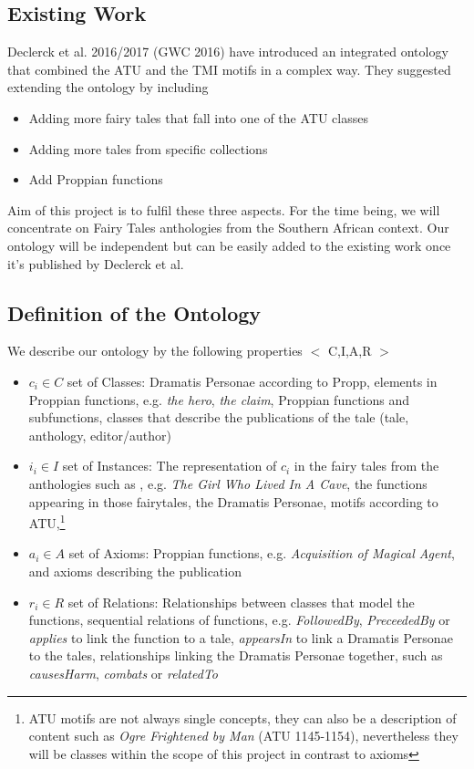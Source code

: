 \documentclass[10pt,a4paper]{article}
\begin{document}
	\subsection{Existing Work} 
	Declerck et al. 2016/2017 (GWC 2016) have introduced an integrated ontology that combined the ATU and the TMI motifs in a complex way. They suggested extending the ontology by including 
	
	\begin{itemize}
		\item Adding more fairy tales that fall into one of the ATU classes
		\item Adding more tales from specific collections
		\item Add Proppian functions
		
	\end{itemize}	  
	
	Aim of this project is to fulfil these three aspects. For the time being, we will concentrate on Fairy Tales anthologies from the Southern African context. Our ontology will be independent but can be easily added to the existing work once it's published by Declerck et al.\cite{Declerck2017} 
	\subsection{Definition of the Ontology}
	We describe our ontology by the following properties $<$ C,I,A,R $>$

\begin{itemize}
	
	\item $c_{i} \in C $ set of Classes: Dramatis Personae according to Propp, elements in Proppian functions, e.g. \textit{the hero}, \textit{the claim}, Proppian functions and subfunctions, classes that describe the publications of the tale (tale, anthology, editor/author)       
	\item $i_{i} \in I $ set of Instances: The representation of $c_{i}$ in the fairy tales from the anthologies such as \cite{Smith1989}, e.g. \textit{The Girl Who Lived In A Cave}, the functions appearing in those fairytales, the Dramatis Personae,  motifs according to ATU,\footnote{ATU motifs are not always single concepts, they can also be a description of content such as \textit{Ogre Frightened by Man} (ATU 1145-1154), nevertheless they will be classes within the scope of this project in contrast to axioms} 
	\item $a_{i} \in A$  set of Axioms: Proppian functions, e.g. \textit{Acquisition of Magical Agent}, and axioms describing the publication 
	\item $r_{i} \in R $ set of Relations: Relationships between classes that model the functions, sequential relations of functions, e.g. \textit{FollowedBy}, \textit{PreceededBy} or \textit{applies} to link the function to a tale, \textit{appearsIn} to link a Dramatis Personae to the tales, relationships linking the Dramatis Personae together, such as \textit{causesHarm}, \textit{combats} or \textit{relatedTo}
	 
\end{itemize}
\end{document}
